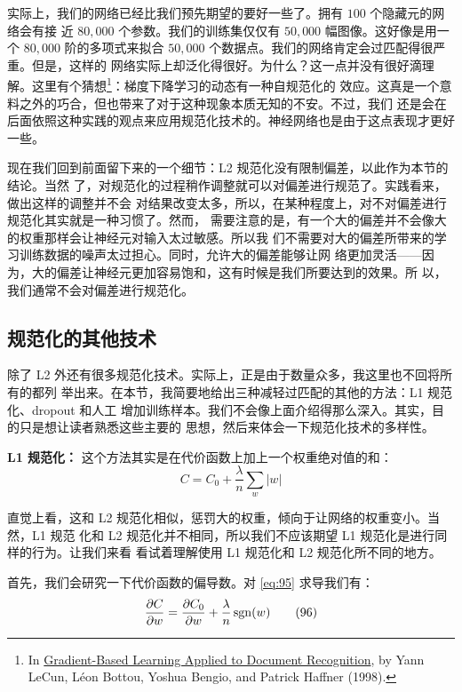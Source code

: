 实际上，我们的网络已经比我们预先期望的要好一些了。拥有 $100$ 个隐藏元的网络会有接
近 $80,000$ 个参数。我们的训练集仅仅有 $50,000$ 幅图像。这好像是用一个 $80,000$
阶的多项式来拟合 $50,000$ 个数据点。我们的网络肯定会过匹配得很严重。但是，这样的
网络实际上却泛化得很好。为什么？这一点并没有很好滴理解。这里有个猜想\footnote{In
  \href{http://yann.lecun.com/exdb/publis/pdf/lecun-01a.pdf}{Gradient-Based
    Learning Applied to Document Recognition}, by Yann LeCun, Léon Bottou,
  Yoshua Bengio, and Patrick Haffner (1998).}：梯度下降学习的动态有一种自规范化的
效应。这真是一个意料之外的巧合，但也带来了对于这种现象本质无知的不安。不过，我们
还是会在后面依照这种实践的观点来应用规范化技术的。神经网络也是由于这点表现才更好
一些。

现在我们回到前面留下来的一个细节：L2 规范化没有限制偏差，以此作为本节的结论。当然
了，对规范化的过程稍作调整就可以对偏差进行规范了。实践看来，做出这样的调整并不会
对结果改变太多，所以，在某种程度上，对不对偏差进行规范化其实就是一种习惯了。然而，
需要注意的是，有一个大的偏差并不会像大的权重那样会让神经元对输入太过敏感。所以我
们不需要对大的偏差所带来的学习训练数据的噪声太过担心。同时，允许大的偏差能够让网
络更加灵活——因为，大的偏差让神经元更加容易饱和，这有时候是我们所要达到的效果。所
以，我们通常不会对偏差进行规范化。

\subsection{规范化的其他技术}

除了 L2 外还有很多规范化技术。实际上，正是由于数量众多，我这里也不回将所有的都列
举出来。在本节，我简要地给出三种减轻过匹配的其他的方法：L1 规范化、dropout 和人工
增加训练样本。我们不会像上面介绍得那么深入。其实，目的只是想让读者熟悉这些主要的
思想，然后来体会一下规范化技术的多样性。

\textbf{L1 规范化：} 这个方法其实是在代价函数上加上一个权重绝对值的和：
\begin{equation}
  C = C_0 + \frac{\lambda}{n} \sum_w |w|
  \label{eq:95}\tag{95}
\end{equation}

直觉上看，这和 L2 规范化相似，惩罚大的权重，倾向于让网络的权重变小。当然，L1 规范
化和 L2 规范化并不相同，所以我们不应该期望 L1 规范化是进行同样的行为。让我们来看
看试着理解使用 L1 规范化和 L2 规范化所不同的地方。

首先，我们会研究一下代价函数的偏导数。对 \eqref{eq:95} 求导我们有：
\begin{equation}
  \frac{\partial C}{\partial w} = \frac{\partial C_0}{\partial w}
  + \frac{\lambda}{n} \, {\rm sgn}(w)
  \label{eq:96}\tag{96}
\end{equation}

